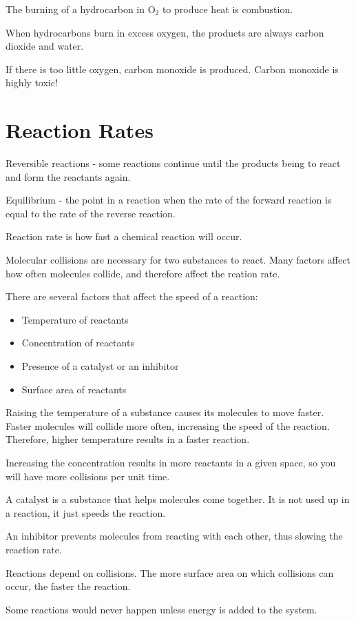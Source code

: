 \documentclass[../hchem.tex]{subfiles}
\begin{document}
The burning of a hydrocarbon in O$_2$ to produce heat is combustion.

When hydrocarbons burn in excess oxygen, the products are always carbon dioxide and water.

If there is too little oxygen, carbon monoxide is produced. Carbon monoxide is highly toxic!
\section{Reaction Rates}
Reversible reactions - some reactions continue until the products being to react and form the reactants again.

Equilibrium - the point in a reaction when the rate of the forward reaction is equal to the rate of the reverse reaction.

Reaction rate is how fast a chemical reaction will occur.

Molecular collisions are necessary for two substances to react. Many factors affect how often molecules collide, and therefore affect the reation rate.

There are several factors that affect the speed of a reaction:
\begin{itemize}
    \item Temperature of reactants 
    \item Concentration of reactants 
    \item Presence of a catalyst or an inhibitor 
    \item Surface area of reactants 
\end{itemize}

Raising the temperature of a substance causes its molecules to move faster. Faster molecules will collide 
more often, increasing the speed of the reaction. Therefore, higher temperature results in a faster reaction.

Increasing the concentration results in more reactants in a given space, so you will have more collisions per unit time.

A catalyst is a substance that helps molecules come together. It is not used up in a reaction, it just speeds the reaction.

An inhibitor prevents molecules from reacting with each other, thus slowing the reaction rate.

Reactions depend on collisions. The more surface area on which collisions can occur, the faster the reaction.

Some reactions would never happen unless energy is added to the system.
\end{document}
